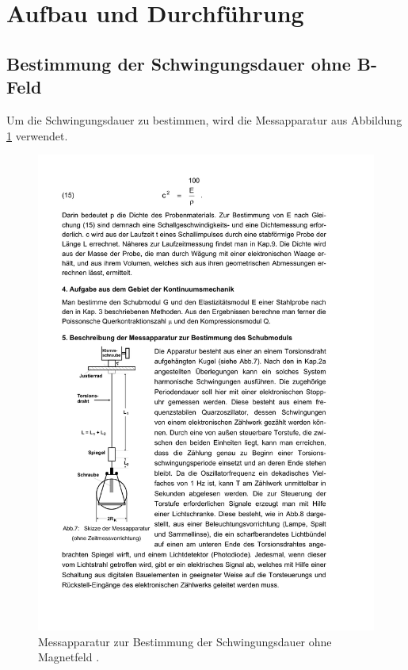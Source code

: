 \section {Aufbau und Durchführung}
\label{sec:durchführung}

\subsection{Bestimmung der Schwingungsdauer ohne B-Feld}

Um die Schwingungsdauer zu bestimmen, wird die Messapparatur aus Abbildung \ref{fig:apparatur1} verwendet.

\begin{figure}
  \centering
  \includegraphics[scale=0.8]{bilder/messapparatur.pdf}
\caption{Messapparatur zur Bestimmung der Schwingungsdauer ohne Magnetfeld \cite{anleitung102}.}
  \label{fig:apparatur1}
\end{figure}

